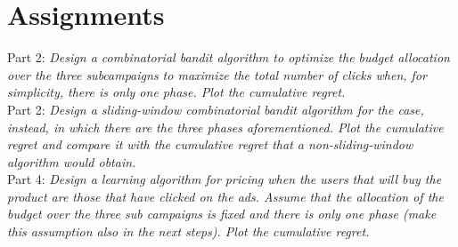 \chapter{Assignments}

Part 2:
\textit{Design a combinatorial bandit algorithm to optimize the budget allocation over the three subcampaigns to maximize the total number of clicks when, for simplicity, there is only one phase. Plot the cumulative regret.}
\label{assPart2}\\

Part 2:
\textit{Design a sliding-window combinatorial bandit algorithm for the case, instead, in which there are the three phases aforementioned. Plot the cumulative regret and compare it with the cumulative regret that a non-sliding-window algorithm would obtain.}
\label{assPart3}\\

Part 4:
\textit{Design a learning algorithm for pricing when the users that will buy the product are those that have clicked on the ads. Assume that the allocation of the budget over the three sub campaigns is fixed and there is only one phase (make this assumption also in the next steps). Plot the cumulative regret.}\label{assPart4}